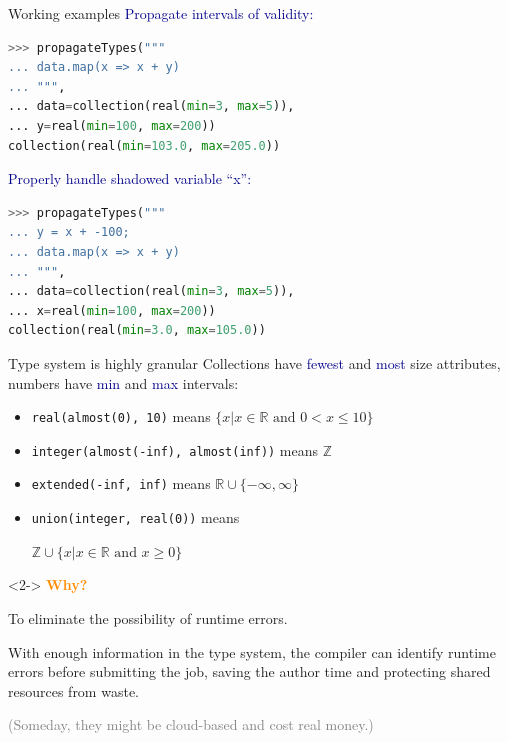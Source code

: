 \documentclass{beamer}
\begin{document}
\begin{frame}[fragile]{Working examples}
\vspace{0.3 cm}
\textcolor{darkblue}{Propagate intervals of validity:}
\begin{lstlisting}[language=python]
>>> propagateTypes("""
... data.map(x => x + y)
... """,
... data=collection(real(min=3, max=5)),
... y=real(min=100, max=200))
collection(real(min=103.0, max=205.0))
\end{lstlisting}

\vfill
\textcolor{darkblue}{Properly handle shadowed variable ``x'':}
\begin{lstlisting}[language=python]
>>> propagateTypes("""
... y = x + -100;
... data.map(x => x + y)
... """,
... data=collection(real(min=3, max=5)),
... x=real(min=100, max=200))
collection(real(min=3.0, max=105.0))
\end{lstlisting}
\end{frame}

\begin{frame}{Type system is highly granular}
\vspace{0.5 cm}
Collections have \textcolor{darkblue}{fewest} and \textcolor{darkblue}{most} size attributes, numbers have \textcolor{darkblue}{min} and \textcolor{darkblue}{max} intervals:
\begin{itemize}
\item {\tt real(almost(0), 10)} means $\{x | x \in \mathbb{R}\mbox{ and } 0 < x \le 10\}$
\item {\tt integer(almost(-inf), almost(inf))} means $\mathbb{Z}$
\item {\tt extended(-inf, inf)} means $\mathbb{R} \cup \{-\infty, \infty\}$
\item {\tt union(integer, real(0))} means

\hfill $\mathbb{Z} \cup \{x | x \in \mathbb{R}\mbox{ and } x \ge 0\}$
\end{itemize}

\vfill
\begin{uncoverenv}<2->
\textcolor{darkorange}{\bf Why?}

\vspace{0.2 cm}
To eliminate the possibility of runtime errors.

\vspace{0.2 cm}
With enough information in the type system, the compiler can identify runtime errors before submitting the job, saving the author time and protecting shared resources from waste.

\vspace{0.2 cm}
\textcolor{gray}{(Someday, they might be cloud-based and cost real money.)}
\end{uncoverenv}
\end{frame}
\end{document}
